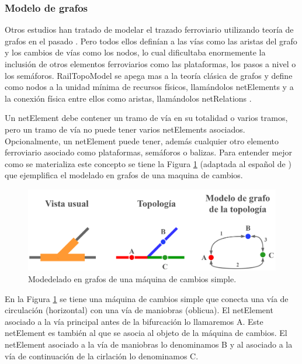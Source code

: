\subsubsection{Modelo de grafos}
    \label{sec:RTM}
    
    Otros estudios han tratado de modelar el trazado ferroviario utilizando teoría de grafos en el pasado \cite{Paper_9,Paper_101,Paper_102,Paper_103}. Pero todos ellos definían a las vías como las aristas del grafo y los cambios de vías como los nodos, lo cual dificultaba enormemente la inclusión de otros elementos ferroviarios como las plataformas, los pasos a nivel o los semáforos. RailTopoModel se apega mas a la teoría clásica de grafos y define como nodos a la unidad mínima de recursos físicos, llamándolos netElements y a la conexión física entre ellos como aristas, llamándolos netRelations \cite{Paper_109}.

    Un netElement debe contener un tramo de vía en su totalidad o varios tramos, pero un tramo de vía no puede tener varios netElements asociados. Opcionalmente, un netElement puede tener, además cualquier otro elemento ferroviario asociado como plataformas, semáforos o balizas. Para entender mejor como se materializa este concepto se tiene la Figura \ref{fig:grafos_1} (adaptada al español de \cite{Paper_109}) que ejemplifica el modelado en grafos de una maquina de cambios.

    \begin{figure}[H]
        \centering
        \includegraphics[width=1\textwidth]{Figuras/grafos}
        \centering\caption{Modedelado en grafos de una máquina de cambios simple.}
        \label{fig:grafos_1}
    \end{figure}

    En la Figura \ref{fig:grafos_1} se tiene una máquina de cambios simple que conecta una vía de circulación (horizontal) con una vía de maniobras (oblicua). El netElement asociado a la vía principal antes de la bifurcación lo llamaremos A. Este netElement es también al que se asocia al objeto de la máquina de cambios. El netElement asociado a la vía de maniobras lo denominamos B y al asociado a la vía de continuación de la cirlación lo denominamos C.

